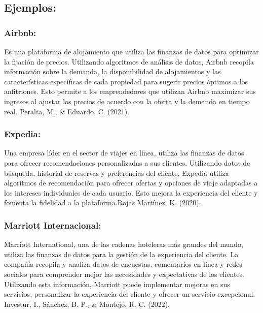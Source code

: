 \documentclass[
  letterpaper,
  DIV=11,
  numbers=noendperiod]{scrreprt}
\begin{document}
\hypertarget{ejemplos}{%
\subsection{Ejemplos:}\label{ejemplos}}

\hypertarget{airbnb}{%
\subsubsection{Airbnb:}\label{airbnb}}

Es una plataforma de alojamiento que utiliza las finanzas de datos para
optimizar la fijación de precios. Utilizando algoritmos de análisis de
datos, Airbnb recopila información sobre la demanda, la disponibilidad
de alojamientos y las características específicas de cada propiedad para
sugerir precios óptimos a los anfitriones. Esto permite a los
emprendedores que utilizan Airbnb maximizar sus ingresos al ajustar los
precios de acuerdo con la oferta y la demanda en tiempo real. Peralta,
M., \& Eduardo, C. (2021).

\hypertarget{expedia}{%
\subsubsection{Expedia:}\label{expedia}}

Una empresa líder en el sector de viajes en línea, utiliza las finanzas
de datos para ofrecer recomendaciones personalizadas a sus clientes.
Utilizando datos de búsqueda, historial de reservas y preferencias del
cliente, Expedia utiliza algoritmos de recomendación para ofrecer
ofertas y opciones de viaje adaptadas a los intereses individuales de
cada usuario. Esto mejora la experiencia del cliente y fomenta la
fidelidad a la plataforma.Rojas Martínez, K. (2020).

\hypertarget{marriott-internacional}{%
\subsubsection{Marriott Internacional:}\label{marriott-internacional}}

Marriott International, una de las cadenas hoteleras más grandes del
mundo, utiliza las finanzas de datos para la gestión de la experiencia
del cliente. La compañía recopila y analiza datos de encuestas,
comentarios en línea y redes sociales para comprender mejor las
necesidades y expectativas de los clientes. Utilizando esta información,
Marriott puede implementar mejoras en sus servicios, personalizar la
experiencia del cliente y ofrecer un servicio excepcional. Investur, I.,
Sánchez, B. P., \& Montejo, R. C. (2022).
\end{document}
